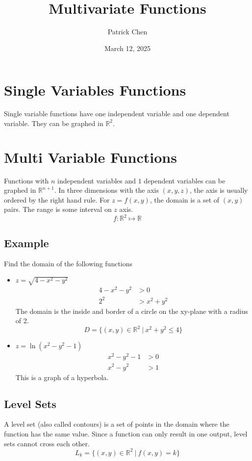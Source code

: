 \documentclass{article}
\title{Multivariate Functions}
\author{Patrick Chen}
\date{March 12, 2025}
\theoremstyle{mytheoremstyle}
\theoremstyle{mytheoremstyle}
\theoremstyle{myproblemstyle}
\begin{document}
    \maketitle
    \section*{Single Variables Functions}
    Single variable functions have one independent variable and one dependent
    variable. They can be graphed in $\mathbb{R}^2$.

    \section*{Multi Variable Functions}
    Functions with $n$ independent variables and $1$ dependent variables can be
    graphed in $\mathbb{R}^{n+1}$. In three dimensions with the axis $(x,y,z)$,
    the axis is usually ordered by the right hand rule. For $z=f(x,y)$, the
    domain is a set of $(x,y)$ pairs. The range is some interval on $z$ axis.
    \[
        f: \mathbb{R}^2 \mapsto \mathbb{R}
    \]

    \subsection*{Example}
    Find the domain of the following functions
    \begin{itemize}
        \item $z = \sqrt{4-x^2-y^2}$
            \begin{align*}
                4-x^2-y^2 &> 0 \\
                2^2 &> x^2+y^2
            \end{align*}
            The domain is the inside and border of a circle on the xy-plane
            with a radius of 2.
            \[
                D = \{(x,y)\in \mathbb{R}^2\ |\ x^2+y^2 \le 4\}
            \]
        \item $z=\ln(x^2-y^2-1)$
            \begin{align*}
                x^2-y^2-1 &> 0 \\
                x^2 - y ^2 &> 1
            \end{align*}
            This is a graph of a hyperbola.
    \end{itemize}

    \subsection*{Level Sets}
    A level set (also called contours) is a set of points in the domain where
    the function has the same value. Since a function can only result in one
    output, level sets cannot cross each other.
    \[
        L_k = \{(x,y)\in \mathbb{R}^2\ |\ f(x,y) = k\}
    \]
\end{document}
